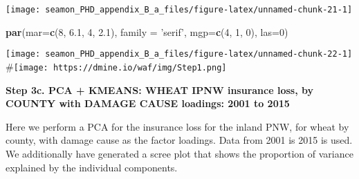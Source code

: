 \documentclass[]{article}
\newenvironment{Shaded}{\begin{snugshade}}{\end{snugshade}}
\newcommand{\CommentTok}[1]{\textcolor[rgb]{0.56,0.35,0.01}{\textit{#1}}}
\newcommand{\DataTypeTok}[1]{\textcolor[rgb]{0.13,0.29,0.53}{#1}}
\newcommand{\DecValTok}[1]{\textcolor[rgb]{0.00,0.00,0.81}{#1}}
\newcommand{\FloatTok}[1]{\textcolor[rgb]{0.00,0.00,0.81}{#1}}
\newcommand{\KeywordTok}[1]{\textcolor[rgb]{0.13,0.29,0.53}{\textbf{#1}}}
\newcommand{\NormalTok}[1]{#1}
\newcommand{\OperatorTok}[1]{\textcolor[rgb]{0.81,0.36,0.00}{\textbf{#1}}}
\newcommand{\StringTok}[1]{\textcolor[rgb]{0.31,0.60,0.02}{#1}}
\begin{document}
\texttt{[image: seamon\_PHD\_appendix\_B\_a\_files/figure-latex/unnamed-chunk-21-1]}

\begin{Shaded}
\begin{Highlighting}[]
\KeywordTok{par}\NormalTok{(}\DataTypeTok{mar=}\KeywordTok{c}\NormalTok{(}\DecValTok{8}\NormalTok{, }\FloatTok{6.1}\NormalTok{, }\DecValTok{4}\NormalTok{, }\FloatTok{2.1}\NormalTok{), }\DataTypeTok{family =} \StringTok{'serif'}\NormalTok{, }\DataTypeTok{mgp=}\KeywordTok{c}\NormalTok{(}\DecValTok{4}\NormalTok{, }\DecValTok{1}\NormalTok{, }\DecValTok{0}\NormalTok{), }\DataTypeTok{las=}\DecValTok{0}\NormalTok{)}
\end{Highlighting}
\end{Shaded}

\begin{Shaded}
\end{Shaded}

\texttt{[image: seamon\_PHD\_appendix\_B\_a\_files/figure-latex/unnamed-chunk-22-1]}
\#\texttt{[image: https://dmine.io/waf/img/Step1.png]}

\textbf{Step 3c. PCA + KMEANS: WHEAT IPNW insurance loss, by COUNTY with
DAMAGE CAUSE loadings: 2001 to 2015}

Here we perform a PCA for the insurance loss for the inland PNW, for
wheat by county, with damage cause as the factor loadings. Data from
2001 is 2015 is used. We additionally have generated a scree plot that
shows the proportion of variance explained by the individual components.
\end{document}
